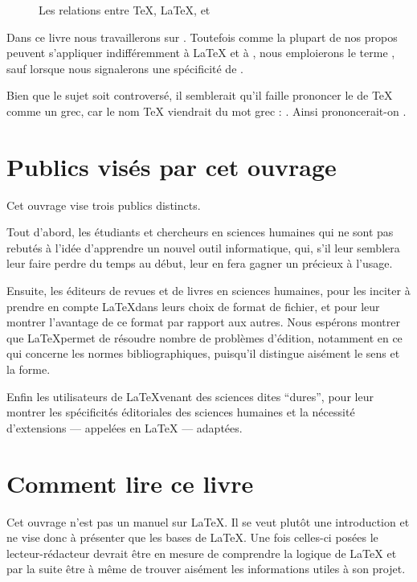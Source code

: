 \begin{figure}[ht]
\centering

\caption{Les relations entre \TeX{}, \LaTeX{}, \XeTeX{} et \XeLaTeX{}}\label{sch:tex}
\end{figure} 

Dans  ce livre nous travaillerons sur \XeLaTeX{}. Toutefois comme la plupart de nos propos peuvent s'appliquer indifféremment  à \LaTeX{} et à \XeLaTeX{}, nous emploierons
le terme \forme{\LaTeX{}}, sauf lorsque nous signalerons une spécificité de \XeLaTeX{}.

\begin{plusloins}
Bien que le sujet soit controversé, il semblerait qu'il faille prononcer le   de \TeX{} comme un  grec, car le nom \TeX{} viendrait du mot grec  : . Ainsi prononcerait-on .
\end{plusloins}


\section{Publics visés par cet ouvrage}

Cet ouvrage vise  trois publics distincts.

Tout d'abord, les étudiants et chercheurs en sciences humaines qui ne sont pas rebutés à l'idée d'apprendre un nouvel outil informatique, qui, s'il leur semblera leur faire perdre du temps au début, leur en fera gagner un précieux  à l'usage.

Ensuite, les éditeurs de revues et de livres en sciences humaines, pour les inciter à prendre en compte \LaTeX dans leurs choix de format de fichier, et pour leur montrer l'avantage de ce format par rapport aux autres. Nous espérons montrer que \LaTeX permet de résoudre nombre de problèmes d'édition, notamment en ce qui concerne les normes bibliographiques, puisqu'il distingue aisément le sens et la forme.

Enfin les utilisateurs de \LaTeX venant des sciences dites \enquote{dures}, pour leur montrer les spécificités éditoriales des sciences humaines et la nécessité d'extensions --- appelées  en \LaTeX{} --- adaptées.


\section{Comment lire ce livre}

Cet ouvrage n'est pas un manuel sur \LaTeX{}. Il se veut plutôt une introduction et ne vise donc à présenter que les bases de \LaTeX{}. Une fois celles-ci posées le lecteur-rédacteur devrait être en mesure de comprendre la logique de \LaTeX{} et par la suite être à même de trouver aisément les informations utiles à son projet.

